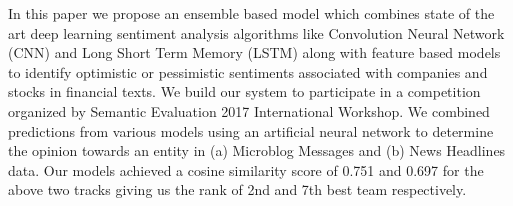 In this  paper we propose an ensemble based model which combines state of the art deep learning sentiment analysis algorithms like Convolution Neural Network (CNN) and Long Short Term Memory (LSTM) along with feature based models to identify optimistic or pessimistic sentiments associated with companies and stocks in financial texts. We build our system to participate in a competition organized by Semantic Evaluation 2017 International Workshop. We combined predictions from various models using an artificial neural network to determine the opinion towards an entity in (a) Microblog Messages and (b) News Headlines data. Our models achieved a cosine similarity score of 0.751 and 0.697 for the above two tracks giving us the rank of 2nd and 7th best team respectively.
